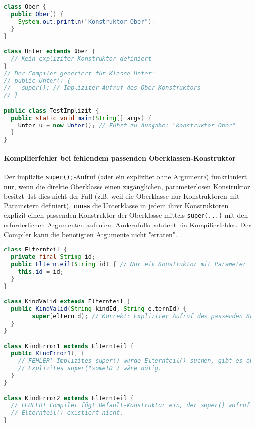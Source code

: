 \begin{lstlisting}[language=Java, caption={Impliziter Konstruktor und \texttt{super()}-Aufruf durch den Compiler}]
class Ober {
  public Ober() {
    System.out.println("Konstruktor Ober");
  }
}

class Unter extends Ober {
  // Kein expliziter Konstruktor definiert
}
// Der Compiler generiert für Klasse Unter:
// public Unter() {
//   super(); // Impliziter Aufruf des Ober-Konstruktors
// }

public class TestImplizit {
  public static void main(String[] args) {
    Unter u = new Unter(); // Führt zu Ausgabe: "Konstruktor Ober"
  }
}
\end{lstlisting}

\paragraph{Kompilierfehler bei fehlendem passenden Oberklassen-Konstruktor}
Der implizite \texttt{super();}-Aufruf (oder ein expliziter ohne Argumente) funktioniert nur, wenn die direkte Oberklasse einen 
zugänglichen, parameterlosen Konstruktor besitzt. Ist dies nicht der Fall (z.B. weil die Oberklasse nur Konstruktoren mit Parametern definiert), 
\textbf{muss} die Unterklasse in jedem ihrer Konstruktoren explizit einen passenden Konstruktor der Oberklasse mittels \texttt{super(...)} mit 
den erforderlichen Argumenten aufrufen. Andernfalls entsteht ein Kompilierfehler. Der Compiler kann die benötigten Argumente nicht "erraten".

\begin{lstlisting}[language=Java, caption={Kompilierfehler: \texttt{super()}-Aufruf scheitert bei parametrisiertem Superkonstruktor}]
class Elternteil {
  private final String id;
  public Elternteil(String id) { // Nur ein Konstruktor mit Parameter
    this.id = id;
  }
}

class KindValid extends Elternteil {
  public KindValid(String kindId, String elternId) {
        super(elternId); // Korrekt: Expliziter Aufruf des passenden Konstruktors
  }
}

class KindError1 extends Elternteil {
  public KindError1() {
    // FEHLER! Implizites super() würde Elternteil() suchen, gibt es aber nicht.
    // Explizites super("someID") wäre nötig.
  }
}

class KindError2 extends Elternteil {
  // FEHLER! Compiler fügt Default-Konstruktor ein, der super() aufruft.
  // Elternteil() existiert nicht.
}
\end{lstlisting}

